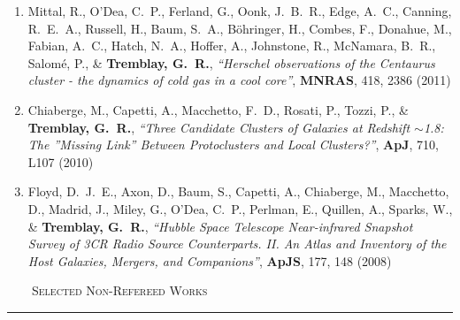 \documentclass[11pt]{article}
\makeatletter
\def\vhrulefill#1{\leavevmode\leaders\hrule\@height#1\hfill \kern\z@}
\makeatother
\begin{document}
\begin{enumerate}[resume]
\item Mittal, R., O'Dea, C.~P., Ferland, G., Oonk, J.~B.~R., Edge, A.~C.,
Canning, R.~E.~A., Russell, H., Baum, S.~A., B{\"o}hringer, H., Combes, F.,
Donahue, M., Fabian, A.~C., Hatch, N.~A., Hoffer, A., Johnstone, R.,
McNamara, B.~R., Salom{\'e}, P.,
\& \textbf{Tremblay, G.~R.}, \textit{``Herschel observations of the Centaurus cluster - the dynamics of cold gas in a cool core''}, \textbf{MNRAS}, 418,  2386 (2011)




\item Chiaberge, M., Capetti, A., Macchetto, F.~D., Rosati, P., Tozzi, P.,
\& \textbf{Tremblay, G.~R.}, \textit{``Three Candidate Clusters of Galaxies at Redshift $\sim$1.8: The ''Missing Link'' Between Protoclusters and Local Clusters?''}, \textbf{ApJ}, 710,  L107 (2010)





\item Floyd, D.~J.~E., Axon, D., Baum, S., Capetti, A., Chiaberge, M.,
Macchetto, D., Madrid, J., Miley, G., O'Dea, C.~P., Perlman, E., Quillen,
A., Sparks, W.,
\& \textbf{Tremblay, G.~R.},  \textit{``Hubble Space Telescope Near-infrared Snapshot Survey of 3CR Radio Source Counterparts. II. An Atlas and Inventory of the Host Galaxies, Mergers, and Companions''}, \textbf{ApJS}, 177,  148 (2008)

\end{enumerate}

\noindent \textsc{ ~~~~Selected Non-Refereed Works} \vhrulefill{0.4pt}
\end{document}
